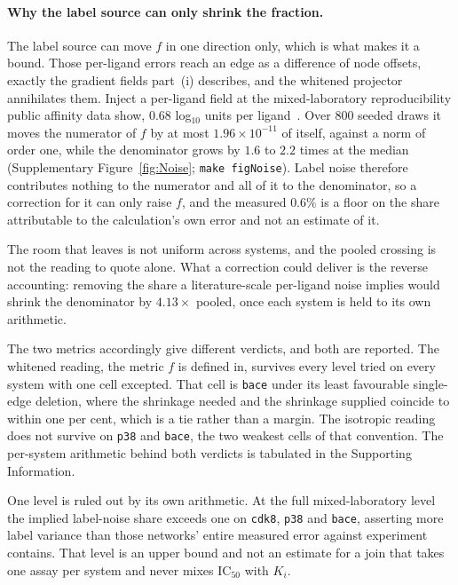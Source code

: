 \paragraph{Why the label source can only shrink the fraction.} The label source can move $f$ in one direction only, which is what makes it a bound. Those
per-ligand errors reach an edge as a difference of node offsets, exactly the gradient fields
part~(i) describes, and the whitened projector annihilates them. Inject a per-ligand field at the mixed-laboratory reproducibility public affinity data show,
$0.68$ log$_{10}$ units per ligand~\citep{kalliokoski2013mixedic50}. Over $800$ seeded draws it
moves the numerator of $f$ by at most $1.96\times10^{-11}$ of itself, against a norm of order one,
while the denominator grows by $1.6$ to $2.2$ times at the median (Supplementary
Figure~\ref{fig:Noise}; \texttt{make figNoise}). Label noise therefore contributes nothing to the numerator and all of it
to the denominator, so a correction for it can only raise $f$, and the measured $0.6\%$ is a floor
on the share attributable to the calculation's own error and not an estimate of it.

The room that leaves is not uniform across systems, and the pooled crossing is not the reading to
quote alone. What a correction could deliver is the reverse accounting: removing the share a
literature-scale per-ligand noise implies would shrink the denominator by $4.13\times$ pooled,
once each system is held to its own arithmetic.

The two metrics accordingly give different verdicts, and both are reported. The whitened reading,
the metric $f$ is defined in, survives every level tried on every system with one cell excepted.
That cell is \texttt{bace} under its least favourable single-edge deletion, where the shrinkage
needed and the shrinkage supplied coincide to within one per cent, which is a tie rather than a
margin. The isotropic reading does not survive on \texttt{p38} and \texttt{bace}, the two weakest
cells of that convention. The per-system arithmetic behind both verdicts is tabulated in the
Supporting Information.

One level is ruled out by its own arithmetic. At the full mixed-laboratory level the implied
label-noise share exceeds one on \texttt{cdk8}, \texttt{p38} and \texttt{bace}, asserting more
label variance than those networks' entire measured error against experiment contains. That level
is an upper bound and not an estimate for a join that takes one assay per system and never mixes
$\mathrm{IC}_{50}$ with $K_i$.

